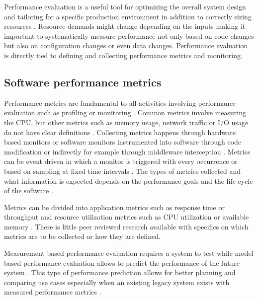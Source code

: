 Performance evaluation is a useful tool for optimizing the overall system design and tailoring for a specific production environment in addition to correctly sizing resources \parencite{brunnertPerformanceorientedDevOpsResearch2015,wallerIncludingPerformanceBenchmarks2015}.  Resource demands might change depending on the inputs \parencite{brunnertPerformanceorientedDevOpsResearch2015} making it important to systematically measure performance not only based on code changes but also on configuration changes or even data changes. Performance evaluation is directly tied to defining and collecting performance metrics and monitoring.

\subsection{Software performance metrics}

Performance metrics are fundamental to all activities involving performance evaluation such as profiling or monitoring \parencite{brunnertPerformanceorientedDevOpsResearch2015}. Common metrics involve measuring the CPU, but other metrics such as memory usage, network traffic or I/O usage do not have clear definitions \parencite{brunnertPerformanceorientedDevOpsResearch2015}. Collecting metrics happens through hardware based monitors or software monitors instrumented into software through code modification or indirectly for example through middleware interception \parencite{brunnertPerformanceorientedDevOpsResearch2015}. Metrics can be event driven in which a monitor is triggered with every occurrence or based on sampling at fixed time intervals \parencite{brunnertPerformanceorientedDevOpsResearch2015}. The types of metrics collected and what information is expected depends on the performance goals and the life cycle of the software \parencite{brunnertPerformanceorientedDevOpsResearch2015}.

Metrics can be divided into application metrics such as response time or throughput and resource utilization metrics such as CPU utilization or available memory \parencite{brunnertPerformanceorientedDevOpsResearch2015}. There is little peer reviewed research available with specifics on which metrics are to be collected or how they are defined.  

Measurement based performance evaluation requires a system to test while model based performance evaluation allows to predict the performance of the future system \parencite{brunnertPerformanceorientedDevOpsResearch2015}. This type of performance prediction allows for better planning and comparing use cases especially when an existing legacy system exists with measured performance metrics \parencite{brunnertPerformanceorientedDevOpsResearch2015}.

